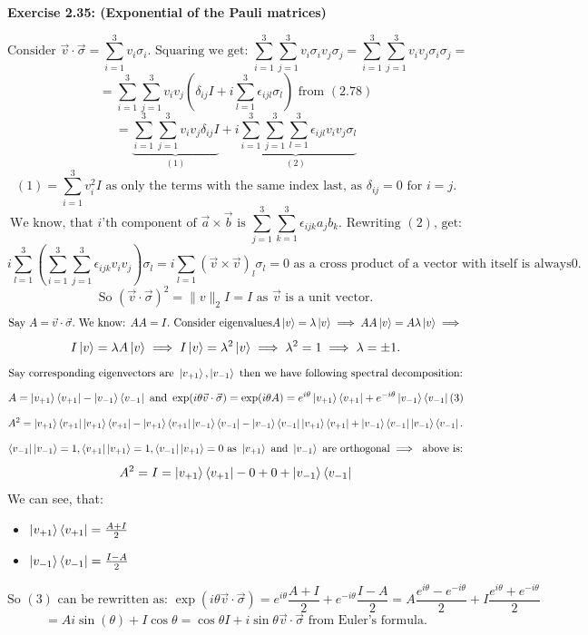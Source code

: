 \documentclass{article}
\begin{document}
\begin{framed}
    \noindent \textbf{Exercise 2.35: (Exponential of the Pauli matrices)}
    
    \medskip
    $$
    \text{Consider } \vec{v} \cdot \vec{\sigma} = \sum_{i=1}^{3}{v_i\sigma_i}. \text{ Squaring we get: } \sum_{i=1}^{3}\sum_{j=1}^{3}v_i\sigma_iv_j\sigma_j = \sum_{i=1}^{3}\sum_{j=1}^{3}v_iv_j\sigma_i\sigma_j = 
    $$
    $$
    = \sum_{i=1}^{3}\sum_{j=1}^{3}v_iv_j(\delta_{ij}I + i\sum_{l=1}^{3}{\epsilon_{ijl}\sigma_l}) \text{ from } (2.78) 
    $$
    $$
    = \underbrace{\sum_{i=1}^{3}\sum_{j=1}^{3}v_iv_j\delta_{ij}I}_{(1)} + \underbrace{i\sum_{i=1}^{3}\sum_{j=1}^{3}\sum_{l=1}^{3}{\epsilon_{ijl}v_iv_j\sigma_l}}_{(2)}
    $$
    $$
    (1) = \sum_{i=1}^{3}v_{i}^{2}I \text{ as only the terms with the same index last, as } \delta_{ij} = 0 \text{ for } i = j.
    $$
    $$
    \text{We know, that } i\text{'th component of } \vec{a} \times \vec{b} \text{ is } \sum_{j=1}^{3}\sum_{k=1}^{3}\epsilon_{ijk}a_jb_k \text{. Rewriting } (2) \text{, get:}
    $$
    $$
    i\sum_{l=1}^{3}(\sum_{i=1}^{3}\sum_{j=1}^{3}\epsilon_{ijk}v_iv_j)\sigma_l = i\sum_{l=1}(\vec{v} \times \vec{v})_{l}\sigma_{l} = 0 \text{ as a cross product of a vector with itself is always} 0.
    $$
    $$
    \text{So } (\vec{v} \cdot \vec{\sigma})^2 = \|v\|_2I = I \text{ as } \vec{v} \text{ is a unit vector.}
    $$
    $$
    \text{Say } A=\vec{v}\cdot\vec{\sigma}. \text{ We know: }AA=I. \text{ Consider eigenvalues} A\ket{v} = \lambda\ket{v} \implies AA\ket{v} = A\lambda  \ket{v} \implies
    $$
    $$
    I\ket{v} = \lambda A\ket{v} \implies I\ket{v} = \lambda^2\ket{v} \implies \lambda^2 = 1 \implies \lambda = \pm 1.
    $$
    $$
    \text{Say corresponding eigenvectors} \text{ are } \ket{v_{+1}}, \ket{v_{-1}} \text{ then we have following spectral decomposition:}
    $$
    $$
    A= \ket{v_{+1}}\bra{v_{+1}} - \ket{v_{-1}}\bra{v_{-1}} \text{ and } \exp(i\theta \vec{v} \cdot \vec{\sigma}) = \exp(i\theta A) = e^{i\theta}\ket{v_{+1}}\bra{v_{+1}} + e^{-i\theta}\ket{v_{-1}}\bra{v_{-1}} (3)
    $$
    $$
    A^{2} = \ket{v_{+1}}\bra{v_{+1}}\ket{v_{+1}}\bra{v_{+1}} - \ket{v_{+1}}\bra{v_{+1}}\ket{v_{-1}}\bra{v_{-1}} - \ket{v_{-1}}\bra{v_{-1}}\ket{v_{+1}}\bra{v_{+1}} + \ket{v_{-1}}\bra{v_{-1}}\ket{v_{-1}}\bra{v_{-1}}.
    $$
    $$
    \bra{v_{-1}}\ket{v_{-1}} = 1, \bra{v_{+1}}\ket{v_{+1}} = 1, \bra{v_{-1}}\ket{v_{+1}} = 0 \text{ as } \ket{v_{+1}} \text{ and } \ket{v_{-1}} \text{ are orthogonal} \implies \text{ above is:}
    $$
    $$
    A^2 = I = \ket{v_{+1}}\bra{v_{+1}} - 0 + 0 + \ket{v_{-1}}\bra{v_{-1}}
    $$
    We can see, that:
    \begin{itemize}
        \item $\ket{v_{+1}}\bra{v_{+1}} = \frac{A + I}{2}$
        \item $\ket{v_{-1}}\bra{v_{-1}} = \frac{I - A}{2}$
    \end{itemize}
    $$
    \text{So } (3) \text{ can be rewritten as: } \exp(i\theta \vec{v} \cdot \vec{\sigma}) = e^{i\theta}\frac{A + I}{2} + e^{-i\theta}\frac{I - A}{2} = A\frac{e^{i \theta} - e^{-i \theta}}{2} + I\frac{e^{i \theta} + e^{-i \theta}}{2}
    $$
    $$
    = Ai\sin(\theta) + I\cos{\theta} = \cos{\theta}I + i\sin{\theta}\vec{v}\cdot \vec{\sigma} \text{ from Euler's formula}.
    $$


\end{framed}
\end{document}
